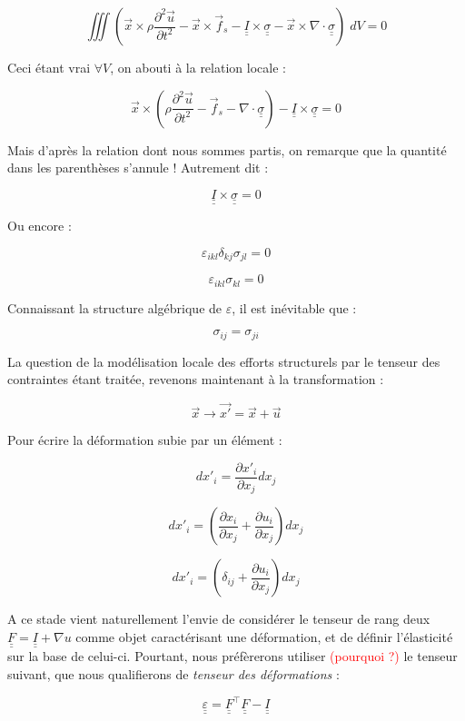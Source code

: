 \documentclass{article}
\begin{document}
\[
\iiint\left(\vec{x}\times\rho\frac{\partial^2 \vec{u}}{\partial t^2}-\vec{x}\times\vec{f}_s -\underline{\underline{I}}\times\underline{\underline{\sigma}}-\vec{x}\times\nabla\cdot\underline{\underline{\sigma}}\right)\; dV=0
\]

Ceci étant vrai $\forall V$, on abouti à la relation locale :

\[
\vec{x}\times\left(\rho\frac{\partial^2 \vec{u}}{\partial t^2}-\vec{f}_s -\nabla\cdot\underline{\underline{\sigma}}\right)-\underline{\underline{I}}\times\underline{\underline{\sigma}}=0
\]

Mais d'après la relation dont nous sommes partis, on remarque que la quantité dans les parenthèses s'annule ! Autrement dit :

\[
\underline{\underline{I}}\times\underline{\underline{\sigma}}=0
\]

Ou encore :

\[
\varepsilon_{ikl}\delta_{kj}\sigma_{jl} = 0
\]

\[
\varepsilon_{ikl}\sigma_{kl} = 0
\]

Connaissant la structure algébrique de $\varepsilon$, il est inévitable que :

\[
\sigma_{ij} = \sigma_{ji}
\]

La question de la modélisation locale des efforts structurels par le tenseur des contraintes étant traitée, revenons maintenant à la transformation :

\[
\vec{x} \rightarrow \vec{x'} = \vec{x}+\vec{u}
\]

Pour écrire la déformation subie par un élément :

\[
dx'_i = \frac{\partial x'_i}{\partial x_j}dx_j
\]

\[
dx'_i = \left(\frac{\partial x_i}{\partial x_j}+\frac{\partial u_i}{\partial x_j}\right)dx_j
\]

\[
dx'_i = \left(\delta_{ij}+\frac{\partial u_i}{\partial x_j}\right)dx_j
\]

A ce stade vient naturellement l'envie de considérer le tenseur de rang deux $\underline{\underline{F}}=\underline{\underline{I}}+\nabla u$ comme objet caractérisant une déformation, et de définir l'élasticité sur la base de celui-ci. Pourtant, nous préfèrerons utiliser \textcolor{red}{(pourquoi ?)} le tenseur suivant, que nous qualifierons de \emph{tenseur des déformations} :

\[
\underline{\underline{\varepsilon}}=\underline{\underline{F}}^\top\underline{\underline{F}}-\underline{\underline{I}}
\]
\end{document}
